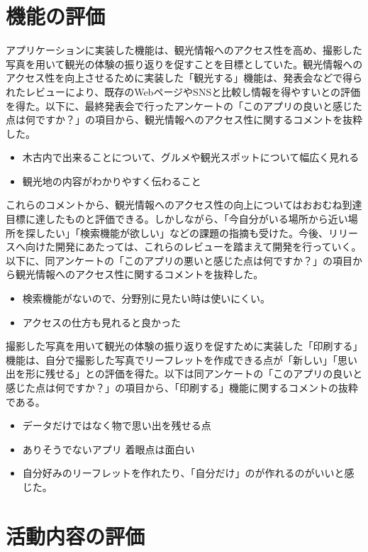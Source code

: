 \section{機能の評価}
アプリケーションに実装した機能は、観光情報へのアクセス性を高め、撮影した写真を用いて観光の体験の振り返りを促すことを目標としていた。観光情報へのアクセス性を向上させるために実装した「観光する」機能は、発表会などで得られたレビューにより、既存のWebページやSNSと比較し情報を得やすいとの評価を得た。以下に、最終発表会で行ったアンケートの「このアプリの良いと感じた点は何ですか？」の項目から、観光情報へのアクセス性に関するコメントを抜粋した。
\begin{itemize}
\item 木古内で出来ることについて、グルメや観光スポットについて幅広く見れる
\item 観光地の内容がわかりやすく伝わること
\end{itemize}
これらのコメントから、観光情報へのアクセス性の向上についてはおおむね到達目標に達したものと評価できる。しかしながら、「今自分がいる場所から近い場所を探したい」「検索機能が欲しい」などの課題の指摘も受けた。今後、リリースへ向けた開発にあたっては、これらのレビューを踏まえて開発を行っていく。以下に、同アンケートの「このアプリの悪いと感じた点は何ですか？」の項目から観光情報へのアクセス性に関するコメントを抜粋した。
\begin{itemize}
\item 検索機能がないので、分野別に見たい時は使いにくい。
\item アクセスの仕方も見れると良かった
\end{itemize}
撮影した写真を用いて観光の体験の振り返りを促すために実装した「印刷する」機能は、自分で撮影した写真でリーフレットを作成できる点が「新しい」「思い出を形に残せる」との評価を得た。以下は同アンケートの「このアプリの良いと感じた点は何ですか？」の項目から、「印刷する」機能に関するコメントの抜粋である。
\begin{itemize}
\item データだけではなく物で思い出を残せる点
\item ありそうでないアプリ 着眼点は面白い
\item 自分好みのリーフレットを作れたり、「自分だけ」のが作れるのがいいと感じた。
\end{itemize}


\section{活動内容の評価}

